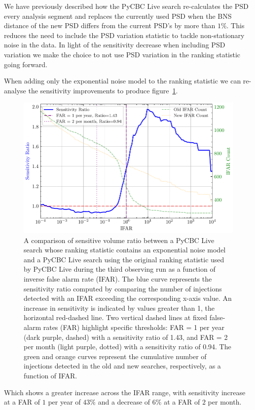 We have previously described how the PyCBC Live search re-calculates the PSD every analysis segment and replaces the currently used PSD when the BNS distance of the new PSD differs from the current PSD's by more than $1\%$. This reduces the need to include the PSD variation statistic to tackle non-stationary noise in the data. In light of the sensitivity decrease when including PSD variation we make the choice to not use PSD variation in the ranking statistic going forward.

When adding only the exponential noise model to the ranking statistic we can re-analyse the sensitivity improvements to produce figure~\ref{5:fig:vt-ratio-fits-only}.
%
\begin{figure}
       \centering
    \includegraphics[width=1.0\textwidth]{images/5_pycbclive/fits-only/fits_only_vt_ratio_with_counts.pdf}
    \caption{A comparison of sensitive volume ratio between a PyCBC Live search whose ranking statistic contains an exponential noise model and a PyCBC Live search using the original ranking statistic used by PyCBC Live during the third observing run as a function of inverse false alarm rate (IFAR). The blue curve represents the sensitivity ratio computed by comparing the number of injections detected with an IFAR exceeding the corresponding x-axis value. An increase in sensitivity is indicated by values greater than 1, the horizontal red-dashed line. Two vertical dashed lines at fixed false-alarm rates (FAR) highlight specific thresholds: FAR = 1 per year (dark purple, dashed) with a sensitivity ratio of 1.43, and FAR = 2 per month (light purple, dotted) with a sensitivity ratio of 0.94. The green and orange curves represent the cumulative number of injections detected in the old and new searches, respectively, as a function of IFAR.}
    \label{5:fig:vt-ratio-fits-only}
\end{figure}
%
Which shows a greater increase across the IFAR range, with sensitivity increase at a FAR of $1$ per year of $43\%$ and a decrease of $6\%$ at a FAR of $2$ per month.


